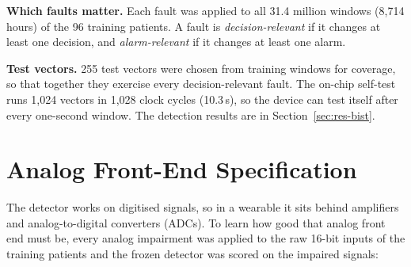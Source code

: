 \textbf{Which faults matter.} Each fault was applied to all 31.4 million windows (8,714 hours) of the 96 training
patients. A fault is \emph{decision-relevant} if it changes at least one decision, and \emph{alarm-relevant} if it
changes at least one alarm.

\textbf{Test vectors.} 255 test vectors were chosen from training windows for coverage, so that together they
exercise every decision-relevant fault. The on-chip self-test runs 1,024 vectors in 1,028 clock cycles
(10.3\,\textmu s), so the device can test itself after every one-second window. The detection results are in
Section~\ref{sec:res-bist}.

\section{Analog Front-End Specification}\label{sec:afe}

The detector works on digitised signals, so in a wearable it sits behind amplifiers and analog-to-digital converters
(ADCs). To learn how good that analog front end must be, every analog impairment was applied to the raw 16-bit inputs
of the training patients and the frozen detector was scored on the impaired signals:

